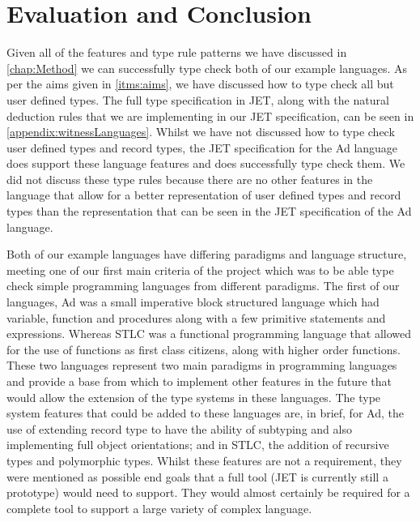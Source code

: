 \chapter{Evaluation and Conclusion}
\label{chap:eval}
Given all of the features and type rule patterns we have discussed in \autoref{chap:Method} we can successfully type check both of our example languages.
As per the aims given in \autoref{itms:aims}, we have discussed how to type check all but user defined types.
The full type specification in JET, along with the natural deduction rules that we are implementing in our JET specification, can be seen in \autoref{appendix:witnessLanguages}.
Whilst we have not discussed how to type check user defined types and record types, the JET specification for the Ad language does support these language features and does successfully type check them.
We did not discuss these type rules because there are no other features in the language that allow for a better representation of user defined types and record types than the representation that can be seen in the JET specification of the Ad language.

Both of our example languages have differing paradigms and language structure, meeting one of our first main criteria of the project which was to be able type check simple programming languages from different paradigms.
The first of our languages, Ad was a small imperative block structured language which had variable, function and procedures along with a few primitive statements and expressions.
Whereas STLC was a functional programming language that allowed for the use of functions as first class citizens, along with higher order functions.
These two languages represent two main paradigms in programming languages and provide a base from which to implement other features in the future that would allow the extension of the type systems in these languages.
The type system features that could be added to these languages are, in brief, for Ad, the use of extending record type to have the ability of subtyping and also implementing full object orientations; and in STLC, the addition of recursive types\cite{pierce2002types,cardelli1996type} and polymorphic types\cite{Cardelli:1985:UTD:6041.6042}.
Whilst these features are not a requirement, they were mentioned as possible end goals that a full tool (JET is currently still a prototype) would need to support.
They would almost certainly be required for a complete tool to support a large variety of complex language.

